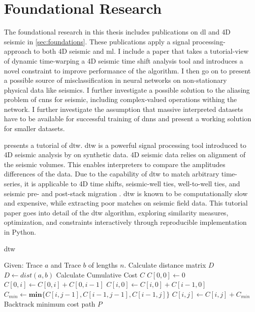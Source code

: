 \section{Foundational Research}

The foundational research in this thesis includes publications on \acl{dl} and 4D seismic in \cref{sec:foundations}. These publications apply a signal processing-approach to both 4D seismic and \acl{ml}. I include a paper that takes a tutorial-view of dynamic time-warping a 4D seismic time shift analysis tool and introduces a novel constraint to improve performance of the algorithm. I then go on to present a possible source of misclassification in neural networks on non-stationary physical data like seismics. I further investigate a possible solution to the aliasing problem of \aclp{cnn} for seismic, including complex-valued operations withing the network. I further investigate the assumption that massive interpreted datasets have to be available for successful training of \aclp{dnn} and present a working solution for smaller datasets.

\citet{dramsch2019dtw} presents a tutorial of \acf{dtw}. \ac{dtw} is a powerful signal processing tool introduced to 4D seismic analysis by \citep{Hale2013} on synthetic data. 4D seismic data relies on alignment of the seismic volumes. This enables interpreters to compare the amplitudes differences of the data. Due to the capability of \ac{dtw} to match arbitrary time-series, it is applicable to 4D time shifts, seismic-well ties, well-to-well ties, and seismic pre- and post-stack migration \citep{Luo*2014}.  \ac{dtw} is known to be computationally slow and expensive, while extracting poor matches on seismic field data. This tutorial paper goes into detail of the \ac{dtw} algorithm, exploring similarity measures, optimization, and constraints interactively through reproducible implementation in Python.

\begin{algorithm}
\caption{\acl{dtw}} \label{dtw}
\begin{algorithmic}[1]
\State Given: Trace $a$ and Trace $b$ of lengths $n$.
\State Calculate distance matrix $D$
\State $D \gets dist(a,b)$
\State Calculate Cumulative Cost $C$
\State $C[0,0] \gets 0$
 
    \State $C[0,i] \gets C[0,i] + C[0,i-1]$
    \State $C[i,0] \gets C[i,0] + C[i-1,0]$
\EndFor
{} 
        \State $C_{min} \gets \textbf{min} \{C[i,j-1], C[i-1,j-1], C[i-1,j]\}$
        \State $C[i,j] \gets C[i,j] + C_{min}$
    \EndFor
\EndFor
\State Backtrack minimum cost path $P$
\State {}
\end{algorithmic}
\end{algorithm}

